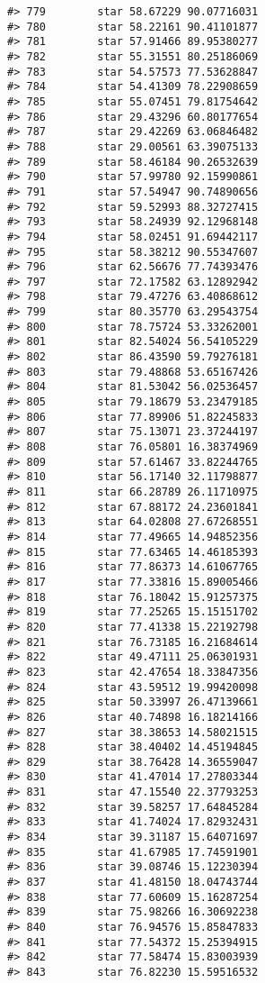 \documentclass[
]{book}
\theoremstyle{definition}
\theoremstyle{definition}
\theoremstyle{definition}
\theoremstyle{definition}
\theoremstyle{remark}
\begin{document}
\begin{verbatim}
#> 779        star 58.67229 90.07716031
#> 780        star 58.22161 90.41101877
#> 781        star 57.91466 89.95380277
#> 782        star 55.31551 80.25186069
#> 783        star 54.57573 77.53628847
#> 784        star 54.41309 78.22908659
#> 785        star 55.07451 79.81754642
#> 786        star 29.43296 60.80177654
#> 787        star 29.42269 63.06846482
#> 788        star 29.00561 63.39075133
#> 789        star 58.46184 90.26532639
#> 790        star 57.99780 92.15990861
#> 791        star 57.54947 90.74890656
#> 792        star 59.52993 88.32727415
#> 793        star 58.24939 92.12968148
#> 794        star 58.02451 91.69442117
#> 795        star 58.38212 90.55347607
#> 796        star 62.56676 77.74393476
#> 797        star 72.17582 63.12892942
#> 798        star 79.47276 63.40868612
#> 799        star 80.35770 63.29543754
#> 800        star 78.75724 53.33262001
#> 801        star 82.54024 56.54105229
#> 802        star 86.43590 59.79276181
#> 803        star 79.48868 53.65167426
#> 804        star 81.53042 56.02536457
#> 805        star 79.18679 53.23479185
#> 806        star 77.89906 51.82245833
#> 807        star 75.13071 23.37244197
#> 808        star 76.05801 16.38374969
#> 809        star 57.61467 33.82244765
#> 810        star 56.17140 32.11798877
#> 811        star 66.28789 26.11710975
#> 812        star 67.88172 24.23601841
#> 813        star 64.02808 27.67268551
#> 814        star 77.49665 14.94852356
#> 815        star 77.63465 14.46185393
#> 816        star 77.86373 14.61067765
#> 817        star 77.33816 15.89005466
#> 818        star 76.18042 15.91257375
#> 819        star 77.25265 15.15151702
#> 820        star 77.41338 15.22192798
#> 821        star 76.73185 16.21684614
#> 822        star 49.47111 25.06301931
#> 823        star 42.47654 18.33847356
#> 824        star 43.59512 19.99420098
#> 825        star 50.33997 26.47139661
#> 826        star 40.74898 16.18214166
#> 827        star 38.38653 14.58021515
#> 828        star 38.40402 14.45194845
#> 829        star 38.76428 14.36559047
#> 830        star 41.47014 17.27803344
#> 831        star 47.15540 22.37793253
#> 832        star 39.58257 17.64845284
#> 833        star 41.74024 17.82932431
#> 834        star 39.31187 15.64071697
#> 835        star 41.67985 17.74591901
#> 836        star 39.08746 15.12230394
#> 837        star 41.48150 18.04743744
#> 838        star 77.60609 15.16287254
#> 839        star 75.98266 16.30692238
#> 840        star 76.94576 15.85847833
#> 841        star 77.54372 15.25394915
#> 842        star 77.58474 15.83003939
#> 843        star 76.82230 15.59516532

\end{verbatim}
\end{document}
